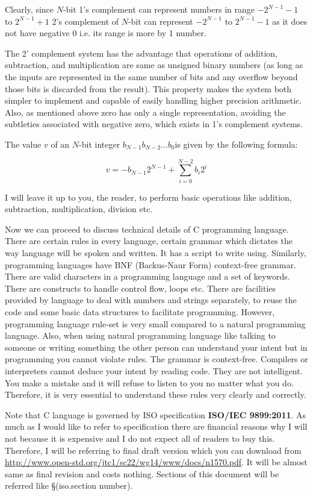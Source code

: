 Clearly, since $N$-bit 1's complement can represent numbers in range
$-2^{N-1}-1$ to $2^{N-1} + 1$ 2's complement of $N$-bit can represent
$-2^{N-1}$ to $2^{N-1} - 1$ as it does not have negative 0 i.e. its range is
more by 1 number.

The 2' complement system has the advantage that operations of addition,
subtraction, and multiplication are same as unsigned binary numbers (as long as
the inputs are represented in the same number of bits and any overflow beyond
those bits is discarded from the result). This property makes the system both
simpler to implement and capable of easily handling higher precision
arithmetic. Also, as mentioned above zero has only a single 
representation, avoiding the subtleties associated with negative zero, which
exists in 1's complement systems.

The value $v$ of an $N$-bit integer $b_{N-1} b_{N-2} \dots b_0 $is given by the
following formula:

\begin{equation}
v=-b_{N-1} 2^{N-1} + \sum_{i=0}^{N-2} b_i 2^i
\end{equation}

I will leave it up to you, the reader, to perform basic operations like
addition, subtraction, multiplication, division etc.

Now we can proceed to discuss technical details of C programming
language. There are certain rules in every language, certain grammar which
dictates the
way language will be spoken and written. It has a script to write
using. Similarly, programming languages have BNF (Backus-Naur Form)
context-free grammar. There are valid characters in a programming language and
a set of keywords. There are constructs to handle control flow, loops
etc. There are facilities provided by language to deal with numbers and strings
separately, to reuse the code and some basic data structures to facilitate
programming. However, programming language rule-set is very small compared
to a natural programming language. Also, when using natural programming
language like talking to someone or writing something the other person can
understand your intent but in programming you cannot violate rules. The grammar
is context-free. Compilers or interpreters cannot deduce your intent by reading
code. They are not intelligent. You make a mistake and it will refuse to listen
to you no matter what you do. Therefore, it is very essential to understand
these rules very clearly and correctly.

Note that C language is governed by ISO specification \textbf{ISO/IEC
  9899:2011}. As much as I would like to refer to specification there are
financial reasons why I will not because it is expensive and I do not expect
all of readers to buy this. Therefore, I will be referring to final draft
version which you can download from
\url{http://www.open-std.org/jtc1/sc22/wg14/www/docs/n1570.pdf}. It will be
almost same as final revision and costs nothing. Sections of this document will
be referred like \S(iso.section number).

